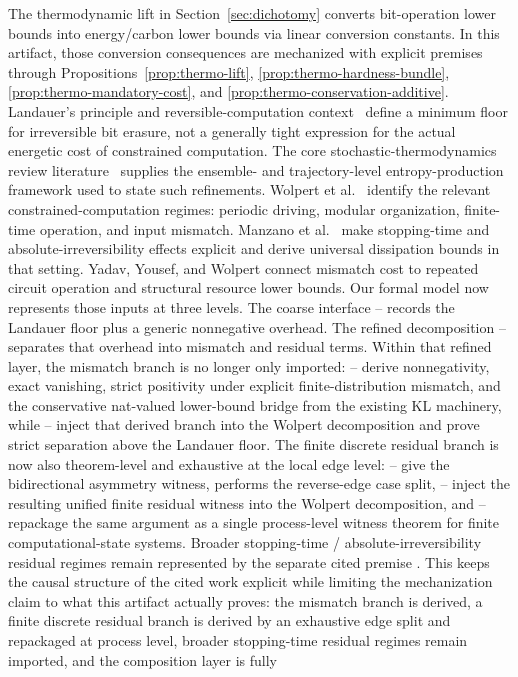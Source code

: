 The thermodynamic lift in Section~\ref{sec:dichotomy} converts bit-operation lower bounds into energy/carbon lower bounds via linear conversion constants. In this artifact, those conversion consequences are mechanized with explicit premises through Propositions~\ref{prop:thermo-lift}, \ref{prop:thermo-hardness-bundle}, \ref{prop:thermo-mandatory-cost}, and \ref{prop:thermo-conservation-additive}. Landauer's principle and reversible-computation context~\cite{landauer1961irreversibility,bennett2003notes} define a minimum floor for irreversible bit erasure, not a generally tight expression for the actual energetic cost of constrained computation. The core stochastic-thermodynamics review literature~\cite{vandenbroeck2015ensemble} supplies the ensemble- and trajectory-level entropy-production framework used to state such refinements. Wolpert et al.\ \cite{wolpert2024stochastic} identify the relevant constrained-computation regimes: periodic driving, modular organization, finite-time operation, and input mismatch. Manzano et al.\ \cite{manzano2024absolute} make stopping-time and absolute-irreversibility effects explicit and derive universal dissipation bounds in that setting. Yadav, Yousef, and Wolpert \cite{yadav2026minimal} connect mismatch cost to repeated circuit operation and structural resource lower bounds. Our formal model now represents those inputs at three levels. The coarse interface -- records the Landauer floor plus a generic nonnegative overhead. The refined decomposition -- separates that overhead into mismatch and residual terms. Within that refined layer, the mismatch branch is no longer only imported: -- derive nonnegativity, exact vanishing, strict positivity under explicit finite-distribution mismatch, and the conservative nat-valued lower-bound bridge from the existing KL machinery, while -- inject that derived branch into the Wolpert decomposition and prove strict separation above the Landauer floor. The finite discrete residual branch is now also theorem-level and exhaustive at the local edge level: -- give the bidirectional asymmetry witness,  performs the reverse-edge case split, -- inject the resulting unified finite residual witness into the Wolpert decomposition, and -- repackage the same argument as a single process-level witness theorem for finite computational-state systems. Broader stopping-time / absolute-irreversibility residual regimes remain represented by the separate cited premise . This keeps the causal structure of the cited work explicit while limiting the mechanization claim to what this artifact actually proves: the mismatch branch is derived, a finite discrete residual branch is derived by an exhaustive edge split and repackaged at process level, broader stopping-time residual regimes remain imported, and the composition layer is fully 